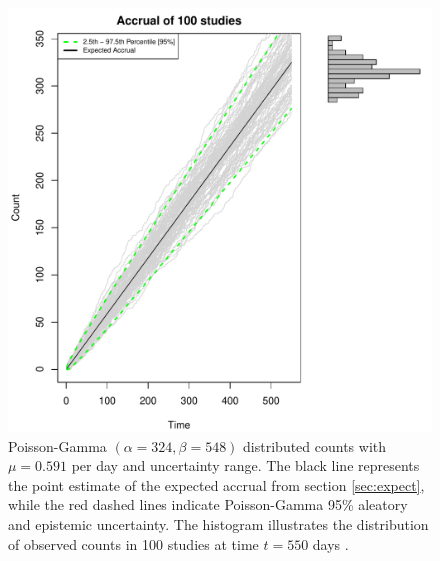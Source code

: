 \begin{figure}
\begin{knitrout}
\color{fgcolor}

{\centering \includegraphics[width=\textwidth-3cm]{figure/ch02_figunnamed-chunk-8-1} 

}


\end{knitrout}
  \caption{Poisson-Gamma $(\alpha = 324, \beta = 548)$ distributed counts with $\mu = 0.591$ per day and uncertainty range. The black line represents the point estimate of the expected accrual from section \ref{sec:expect}, while the red dashed lines indicate Poisson-Gamma 95\% aleatory and epistemic uncertainty. The histogram illustrates the distribution of observed counts in 100 studies at time $t = 550$ days \citep{spiegelhalter2011visualizing, pkgacc}.}
  \label{fig:2_7}
\end{figure}



